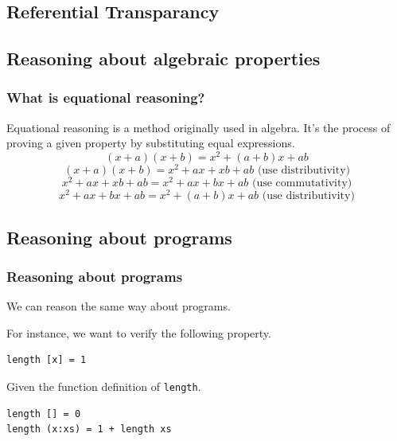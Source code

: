 \documentclass{beamer}
\begin{document}
\subsection{Referential Transparancy}
\subsection{Reasoning about algebraic properties}

\begin{frame}
  \frametitle{What is equational reasoning?}

Equational reasoning is a method originally used in algebra.
 It's the process of proving a given property by substituting equal expressions. 
\begin{equation*}
  \label{eq:sum}
  (x+a)(x+b) = x^2 + (a+b)x+ab
\end{equation*}
\pause
\begin{equation*}
  (x+a)(x+b) = x^2 + ax + xb + ab \text{     (use distributivity)}
\end{equation*}
\pause
\begin{equation*}
x^2 + ax + xb + ab = x^2 + ax + bx + ab \text{     (use commutativity)}
\end{equation*}
\pause
\begin{equation*}
x^2 + ax + bx + ab = x^2 + (a + b)x + ab \text{     (use distributivity)}
\end{equation*}
\end{frame}

\subsection{Reasoning about programs}

\begin{frame}[fragile]
  \frametitle{Reasoning about programs}
  We can reason the same way about programs.

For instance, we want to verify the following property.
\begin{verbatim}
length [x] = 1
\end{verbatim}
Given the function definition of \verb|length|.
\begin{verbatim}
length [] = 0
length (x:xs) = 1 + length xs  
\end{verbatim}

\end{frame}
\end{document}
